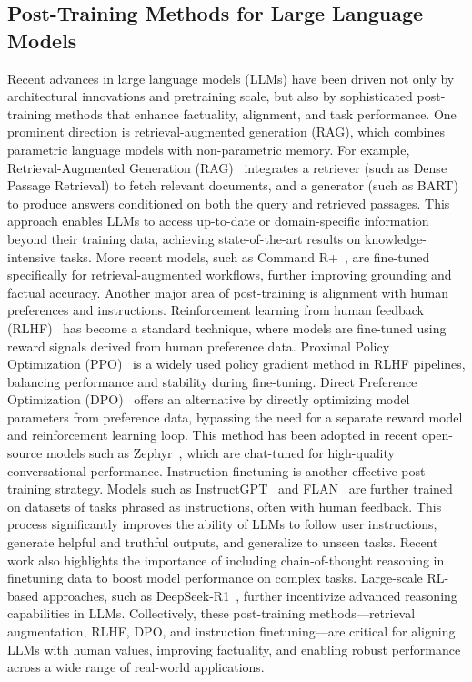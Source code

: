\subsection{Post-Training Methods for Large Language Models}
Recent advances in large language models (LLMs) have been driven not only by architectural innovations and pretraining scale, but also by sophisticated post-training methods that enhance factuality, alignment, and task performance. One prominent direction is retrieval-augmented generation (RAG), which combines parametric language models with non-parametric memory. For example, Retrieval-Augmented Generation (RAG)~\citep{lewis2020retrieval} integrates a retriever (such as Dense Passage Retrieval) to fetch relevant documents, and a generator (such as BART) to produce answers conditioned on both the query and retrieved passages. This approach enables LLMs to access up-to-date or domain-specific information beyond their training data, achieving state-of-the-art results on knowledge-intensive tasks. More recent models, such as Command R+~\citep{cohere2024commandrplus}, are fine-tuned specifically for retrieval-augmented workflows, further improving grounding and factual accuracy.
Another major area of post-training is alignment with human preferences and instructions. Reinforcement learning from human feedback (RLHF)~\citep{christiano2017deep, ouyang2022training} has become a standard technique, where models are fine-tuned using reward signals derived from human preference data. Proximal Policy Optimization (PPO)~\citep{schulman2017proximal} is a widely used policy gradient method in RLHF pipelines, balancing performance and stability during fine-tuning. Direct Preference Optimization (DPO)~\citep{rafailov2023direct} offers an alternative by directly optimizing model parameters from preference data, bypassing the need for a separate reward model and reinforcement learning loop. This method has been adopted in recent open-source models such as Zephyr~\citep{huggingface2023zephyr}, which are chat-tuned for high-quality conversational performance.
Instruction finetuning is another effective post-training strategy. Models such as InstructGPT~\citep{ouyang2022training} and FLAN~\citep{wei2021flan} are further trained on datasets of tasks phrased as instructions, often with human feedback. This process significantly improves the ability of LLMs to follow user instructions, generate helpful and truthful outputs, and generalize to unseen tasks. Recent work also highlights the importance of including chain-of-thought reasoning in finetuning data to boost model performance on complex tasks. Large-scale RL-based approaches, such as DeepSeek-R1~\citep{guo2025deepseekr1}, further incentivize advanced reasoning capabilities in LLMs.
Collectively, these post-training methods—retrieval augmentation, RLHF, DPO, and instruction finetuning—are critical for aligning LLMs with human values, improving factuality, and enabling robust performance across a wide range of real-world applications.

